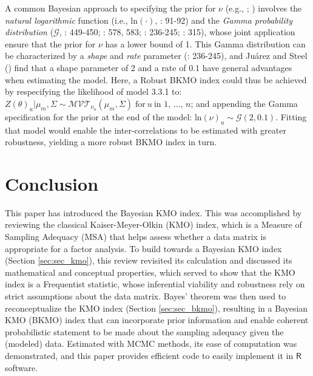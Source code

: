 \documentclass[
  10pt,
  a4paper,
  twoside]{article}
\begin{document}
A common Bayesian approach to specifying the prior for \(\nu\) (e.g., ; ) involves the \emph{natural logarithmic} function (i.e., \(\text{ln}(\cdot)\), : 91-92) and the \emph{Gamma probability distribution} (\(\mathcal{G}\), : 449-450; : 578, 583; : 236-245; : 315), whose joint application ensure that the prior for \(\nu\) has a lower bound of 1. This Gamma distribution can be characterized by a \emph{shape} and \emph{rate} parameter (: 236-245), and Juárez and Steel () find that a shape parameter of 2 and a rate of 0.1 have general advantages when estimating the model. Here, a Robust BKMO index could thus be achieved by respecifying the likelihood of model 3.3.1 to: \(Z(\theta)_u | \mu_m, \Sigma \sim \mathcal{MVT}_{\nu_u}(\mu_m, \Sigma) \; \text{for} \: u \: \text{in 1, } \dots \text{, } n\); and appending the Gamma specification for the prior at the end of the model: \(\text{ln}(\nu)_u \sim \mathcal{G}(2, 0.1)\). Fitting that model would enable the inter-correlations to be estimated with greater robustness, yielding a more robust BKMO index in turn.

\section{Conclusion}\label{sec:sec_conclusion}

This paper has introduced the Bayesian KMO index. This was accomplished by reviewing the classical Kaiser-Meyer-Olkin (KMO) index, which is a Measure of Sampling Adequacy (MSA) that helps assess whether a data matrix is appropriate for a factor analysis. To build towards a Bayesian KMO index (Section \ref{sec:sec_kmo}), this review revisited its calculation and discussed its mathematical and conceptual properties, which served to show that the KMO index is a Frequentist statistic, whose inferential viability and robustness rely on strict assumptions about the data matrix. Bayes' theorem was then used to reconceptualize the KMO index (Section \ref{sec:sec_bkmo}), resulting in a Bayesian KMO (BKMO) index that can incorporate prior information and enable coherent probabilistic statement to be made about the sampling adequacy given the (modeled) data. Estimated with MCMC methods, its ease of computation was demonstrated, and this paper provides efficient code to easily implement it in \(\textsf{R}\) software.
\end{document}
